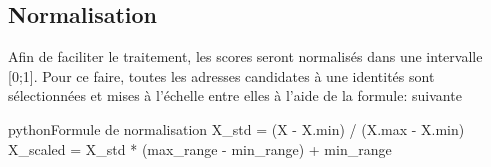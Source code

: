 \subsection{Normalisation~\cite{SKLEARNMINMAX}}
Afin de faciliter le traitement, les scores seront normalisés dans une intervalle [0;1].
Pour ce faire, toutes les adresses candidates à une identités sont sélectionnées et mises à l'échelle entre elles à l'aide de la formule: suivante

\begin{listingsbox}{python}{Formule de normalisation}
X_std = (X - X.min) / (X.max - X.min)
X_scaled = X_std * (max_range - min_range) + min_range
\end{listingsbox}